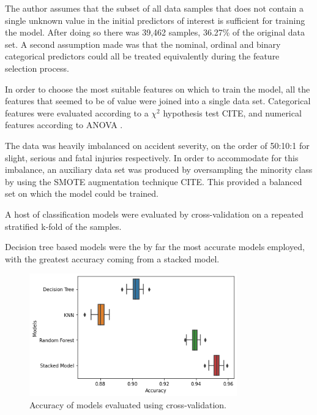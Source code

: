 \documentclass[12pt]{article}
\begin{document}

The author assumes that the subset of all data samples that does not contain a single unknown value in the initial predictors of interest is sufficient for training the model. After doing so there was 39,462 samples, 36.27\% of the original data set. A second assumption made was that the nominal, ordinal and binary categorical predictors could all be treated equivalently during the feature selection process.


In order to choose the most suitable features on which to train the model, all the features that seemed to be of value were joined into a single data set. Categorical features were evaluated according to a $\chi^{2}$ hypothesis test CITE, and numerical features according to ANOVA .


The data was heavily imbalanced on accident severity, on the order of 50:10:1 for slight, serious and fatal injuries respectively. In order to accommodate for this imbalance, an auxiliary data set was produced by oversampling the minority class by using the SMOTE augmentation technique CITE. This provided a balanced set on which the model could be trained.


A host of classification models were evaluated by cross-validation on a repeated stratified k-fold of the samples.

Decision tree based models were the by far the most accurate models employed, with the greatest accuracy coming from a stacked model.

\begin{figure}[h]
\centering     %
\includegraphics[width=0.80\textwidth]{model_plot}
\caption{Accuracy of models evaluated using cross-validation.}
\label{models}
\end{figure}
\end{document}
